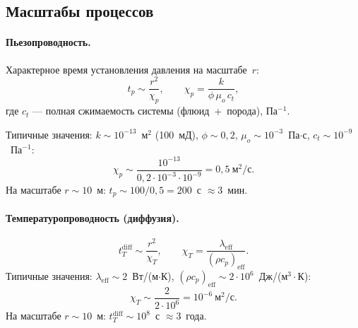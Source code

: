 ﻿\documentclass[12pt,a4paper]{article}
\begin{document}
\subsection{Масштабы процессов}\label{ssec:timescales}

\paragraph{Пьезопроводность.}
Характерное время установления давления на масштабе~$r$:
\begin{equation}\label{eq:tp}
  t_p \sim \frac{r^2}{\chi_p},
  \qquad
  \chi_p = \frac{k}{\phi\,\mu_o\,c_t},
\end{equation}
где $c_t$ --- полная сжимаемость системы
(флюид~+~порода), Па$^{-1}$.

Типичные значения:
$k \sim 10^{-13}$~м$^2$ (100~мД),
$\phi \sim 0{,}2$,
$\mu_o \sim 10^{-3}$~Па$\cdot$с,
$c_t \sim 10^{-9}$~Па$^{-1}$:
\begin{equation}\label{eq:chi_p}
  \chi_p \sim \frac{10^{-13}}{0{,}2\cdot 10^{-3}\cdot 10^{-9}}
  = 0{,}5~\text{м}^2/\text{с}.
\end{equation}
На масштабе $r \sim 10$~м:
$t_p \sim 100 / 0{,}5 = 200$~с $\approx 3$~мин.

\paragraph{Температуропроводность (диффузия).}
\begin{equation}\label{eq:tT_diff}
  t_T^{\mathrm{diff}} \sim \frac{r^2}{\chi_T},
  \qquad
  \chi_T = \frac{\lambda_{\mathrm{eff}}}{(\rho c_p)_{\mathrm{eff}}}.
\end{equation}
Типичные значения:
$\lambda_{\mathrm{eff}} \sim 2$~Вт/(м$\cdot$К),
$(\rho c_p)_{\mathrm{eff}} \sim 2\cdot 10^6$~Дж/(м$^3\cdot$К):
\begin{equation}\label{eq:chi_T}
  \chi_T \sim \frac{2}{2\cdot 10^6} = 10^{-6}~\text{м}^2/\text{с}.
\end{equation}
На масштабе $r \sim 10$~м:
$t_T^{\mathrm{diff}} \sim 10^8$~с $\approx 3$~года.
\end{document}

